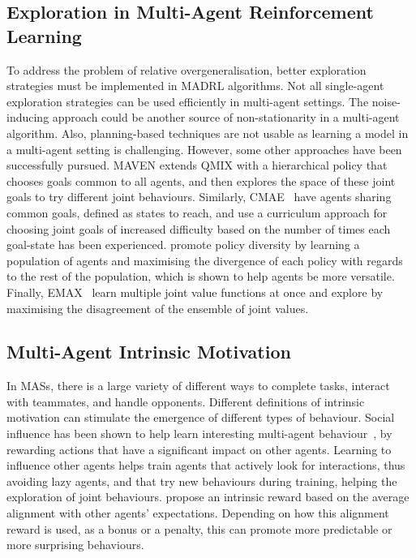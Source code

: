 \subsection{Exploration in Multi-Agent Reinforcement Learning}


To address the problem of relative overgeneralisation, better exploration strategies must be implemented in MADRL algorithms. Not all single-agent exploration strategies can be used efficiently in multi-agent settings. The noise-inducing approach could be another source of non-stationarity in a multi-agent algorithm. Also, plan\-ning-based techniques are not usable as learning a model in a multi-agent setting is challenging. However, some other approaches have been successfully pursued. 
MAVEN \citep{Mahajan2019_MAVEN} extends QMIX with a hierarchical policy that chooses goals common to all agents, and then explores the space of these joint goals to try different joint behaviours. 
Similarly, CMAE~\citep{Liu2021_CMAE} have agents sharing common goals, defined as states to reach, and use a curriculum approach for choosing joint goals of increased difficulty based on the number of times each goal-state has been experienced. 
\cite{Lupu2021_TrajeDi} promote policy diversity by learning a population of agents and maximising the divergence of each policy with regards to the rest of the population, which is shown to help agents be more versatile. 
Finally, EMAX~\citep{Schafer2023_EMAX} learn multiple joint value functions at once and explore by maximising the disagreement of the ensemble of joint values. 

\subsection{Multi-Agent Intrinsic Motivation}

In MASs, there is a large variety of different ways to complete tasks, interact with teammates, and handle opponents. Different definitions of intrinsic motivation can stimulate the emergence of different types of behaviour. 
Social influence has been shown to help learn interesting multi-agent behaviour~\citep{Jaques2019_SocialInfluence, Wang2020_EITI}, by rewarding actions that have a significant impact on other agents. Learning to influence other agents helps train agents that actively look for interactions, thus avoiding lazy agents, and that try new behaviours during training, helping the exploration of joint behaviours. \cite{Ma2022_ELIGN} propose an intrinsic reward based on the average alignment with other agents' expectations. Depending on how this alignment reward is used, as a bonus or a penalty, this can promote more predictable or more surprising behaviours. 

